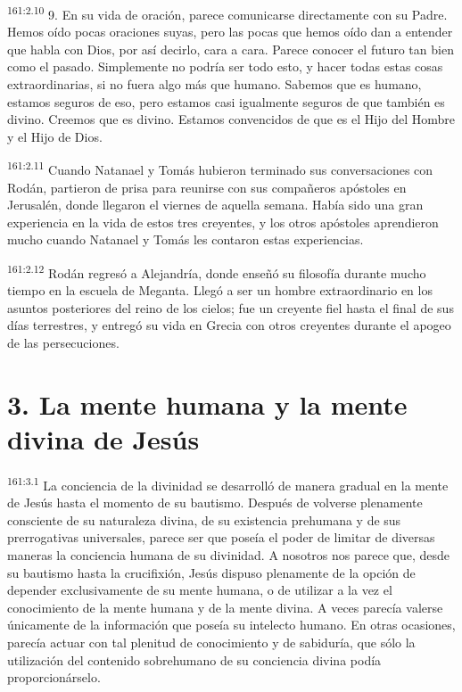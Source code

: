 \par
\textsuperscript{161:2.10} 9. En su vida de oración, parece comunicarse directamente con su Padre. Hemos oído pocas oraciones suyas, pero las pocas que hemos oído dan a entender que habla con Dios, por así decirlo, cara a cara. Parece conocer el futuro tan bien como el pasado. Simplemente no podría ser todo esto, y hacer todas estas cosas extraordinarias, si no fuera algo más que humano. Sabemos que es humano, estamos seguros de eso, pero estamos casi igualmente seguros de que también es divino. Creemos que es divino. Estamos convencidos de que es el Hijo del Hombre y el Hijo de Dios.

\par
\textsuperscript{161:2.11} Cuando Natanael y Tomás hubieron terminado sus conversaciones con Rodán, partieron de prisa para reunirse con sus compañeros apóstoles en Jerusalén, donde llegaron el viernes de aquella semana. Había sido una gran experiencia en la vida de estos tres creyentes, y los otros apóstoles aprendieron mucho cuando Natanael y Tomás les contaron estas experiencias.

\par
\textsuperscript{161:2.12} Rodán regresó a Alejandría, donde enseñó su filosofía durante mucho tiempo en la escuela de Meganta. Llegó a ser un hombre extraordinario en los asuntos posteriores del reino de los cielos; fue un creyente fiel hasta el final de sus días terrestres, y entregó su vida en Grecia con otros creyentes durante el apogeo de las persecuciones.

\section*{3. La mente humana y la mente divina de Jesús}
\par
\textsuperscript{161:3.1} La conciencia de la divinidad se desarrolló de manera gradual en la mente de Jesús hasta el momento de su bautismo. Después de volverse plenamente consciente de su naturaleza divina, de su existencia prehumana y de sus prerrogativas universales, parece ser que poseía el poder de limitar de diversas maneras la conciencia humana de su divinidad. A nosotros nos parece que, desde su bautismo hasta la crucifixión, Jesús dispuso plenamente de la opción de depender exclusivamente de su mente humana, o de utilizar a la vez el conocimiento de la mente humana y de la mente divina. A veces parecía valerse únicamente de la información que poseía su intelecto humano. En otras ocasiones, parecía actuar con tal plenitud de conocimiento y de sabiduría, que sólo la utilización del contenido sobrehumano de su conciencia divina podía proporcionárselo.

